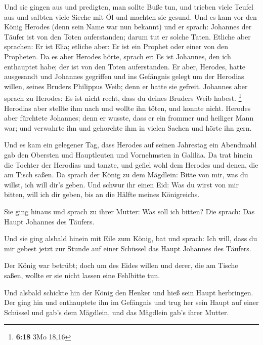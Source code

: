  Und sie gingen aus und predigten, man sollte Buße tun,
 und trieben viele Teufel aus und salbten viele Sieche
mit Öl und machten sie gesund.  Und es kam vor den König
Herodes (denn sein Name war nun bekannt) und er sprach: Johannes der
Täufer ist von den Toten auferstanden; darum tut er solche Taten.
 Etliche aber sprachen: Er ist Elia; etliche aber: Er ist
ein Prophet oder einer von den Propheten.  Da es aber
Herodes hörte, sprach er: Es ist Johannes, den ich enthauptet habe; der
ist von den Toten auferstanden.  Er aber, Herodes, hatte
ausgesandt und Johannes gegriffen und ins Gefängnis gelegt um der
Herodias willen, seines Bruders Philippus Weib; denn er hatte sie
gefreit.  Johannes aber sprach zu Herodes: Es ist nicht
recht, dass du deines Bruders Weib habest. \footnote{\textbf{6:18} 3Mo
  18,16}  Herodias aber stellte ihm nach und wollte ihn
töten, und konnte nicht.  Herodes aber fürchtete
Johannes; denn er wusste, dass er ein frommer und heiliger Mann war; und
verwahrte ihn und gehorchte ihm in vielen Sachen und hörte ihn gern.

 Und es kam ein gelegener Tag, dass Herodes auf seinen
Jahrestag ein Abendmahl gab den Obersten und Hauptleuten und Vornehmsten
in Galiläa.  Da trat hinein die Tochter der Herodias und
tanzte, und gefiel wohl dem Herodes und denen, die am Tisch saßen. Da
sprach der König zu dem Mägdlein: Bitte von mir, was du willst, ich will
dir's geben.  Und schwur ihr einen Eid: Was du wirst von
mir bitten, will ich dir geben, bis an die Hälfte meines Königreichs.

 Sie ging hinaus und sprach zu ihrer Mutter: Was soll ich
bitten? Die sprach: Das Haupt Johannes des Täufers.

 Und sie ging alsbald hinein mit Eile zum König, bat und
sprach: Ich will, dass du mir gebest jetzt zur Stunde auf einer Schüssel
das Haupt Johannes des Täufers.

 Der König war betrübt; doch um des Eides willen und
derer, die am Tische saßen, wollte er sie nicht lassen eine Fehlbitte
tun.

 Und alsbald schickte hin der König den Henker und hieß
sein Haupt herbringen. Der ging hin und enthauptete ihn im Gefängnis
 und trug her sein Haupt auf einer Schüssel und gab's dem
Mägdlein, und das Mägdlein gab's ihrer Mutter.

